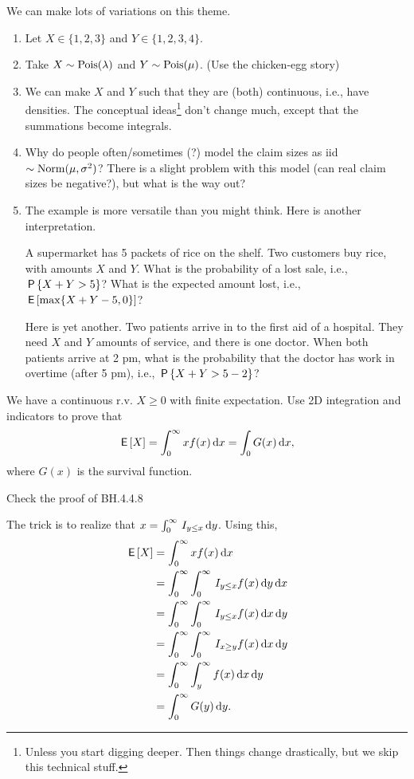 \documentclass[lectures-questions]{subfiles}
\begin{document}
\begin{remark}
We can  make lots of variations on this theme.
\begin{enumerate}
\item Let $X\in \{1,2,3\}$ and $Y\in \{1,2,3,4\}$.
\item Take $X\sim\Pois{\lambda}$ and $Y\sim\Pois{\mu}$. (Use the chicken-egg story)
\item We can make $X$ and $Y$ such that they are (both) continuous, i.e., have densities.
  The conceptual ideas\footnote{Unless you start digging deeper.
    Then things change drastically, but we skip this technical stuff.}
  don't change much, except that the summations become integrals.
\item Why do people often/sometimes (?)
  model the claim sizes as iid $\sim\Norm{\mu, \sigma^{2}}$?
  There is a slight problem with this model (can real claim sizes be negative?), but what is the way out?
\item The example is more versatile than you might think. Here is another interpretation.

A supermarket has 5 packets of rice on the shelf.
Two customers buy rice, with amounts $X$ and $Y$.
What is the probability of a lost sale, i.e., $\P{X+Y>5}$?
What is the expected amount lost, i.e., $\E{ \max\{X+Y - 5,0\}}$?

Here is yet another.
Two patients arrive in to the first aid of a hospital.
They need $X$ and $Y$ amounts of service, and there is one doctor.
When both patients arrive at 2 pm, what is the probability that the doctor has work in overtime (after 5 pm), i.e., $\P{X+Y > 5- 2}$?
\end{enumerate}
\end{remark}



\begin{exercise}
We have a continuous r.v. $X\geq 0$ with finite expectation. Use 2D integration and indicators to prove that
\begin{align}
\E X = \int_{0}^{\infty} x f(x) \d x = \int_{0} G(x) \d x,
\end{align}
where $G(x)$ is the survival function.
\begin{hint}
  Check the proof of BH.4.4.8
\end{hint}
\begin{solution}
The trick is to realize that $x = \int_0^{\infty} \1{y\leq x} \d y$. Using this,
\begin{align}
\E X
&= \int_{0}^{\infty} x f(x) \d x \\
&= \int_{0}^{\infty} \int_{0}^{\infty} \1{y \leq x} f(x) \d y \d x \\
&= \int_{0}^{\infty} \int_{0}^{\infty} \1{y \leq x} f(x) \d x \d y \\
&= \int_{0}^{\infty} \int_{0}^{\infty} \1{x \geq y} f(x) \d x \d y \\
&= \int_{0}^{\infty} \int_{y}^{\infty} f(x) \d x \d y \\
&= \int_{0}^{\infty} G(y) \d y.
\end{align}
\end{solution}
\end{exercise}
\end{document}
